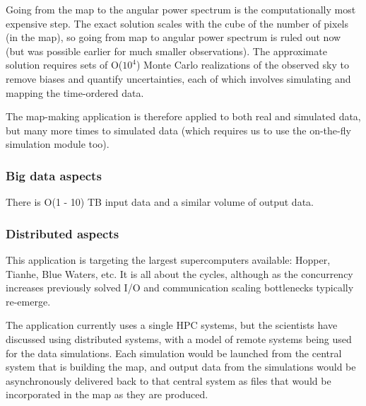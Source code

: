 Going from the map to the angular power spectrum is the
computationally most expensive step. The exact solution scales with
the cube of the number of pixels (in the map), so going from map to
angular power spectrum is ruled out now (but was possible earlier for
much smaller observations). The approximate solution requires sets of
O($10^4$) Monte Carlo realizations of the observed sky to remove
biases and quantify uncertainties, each of which involves simulating
and mapping the time-ordered data.

The map-making application is therefore applied to both real and
simulated data, but many more times to simulated data (which requires
us to use the on-the-fly simulation module too).


 \subsubsection*{Big data aspects}



There is O(1 - 10) TB input data and a similar volume of output data.

 \subsubsection*{Distributed aspects}



This application is targeting the largest supercomputers available: Hopper, Tianhe, Blue Waters, etc. It is all about the cycles, although as the concurrency increases previously solved I/O and communication scaling bottlenecks typically re-emerge.

The application currently uses a single HPC systems, but the scientists have discussed using distributed systems, with a model of remote systems being used for the data simulations.
Each simulation would be launched from the central system that is building the map, and
output data from the simulations would be asynchronously delivered back to that central
system as files that would be incorporated in the map as they are produced.

